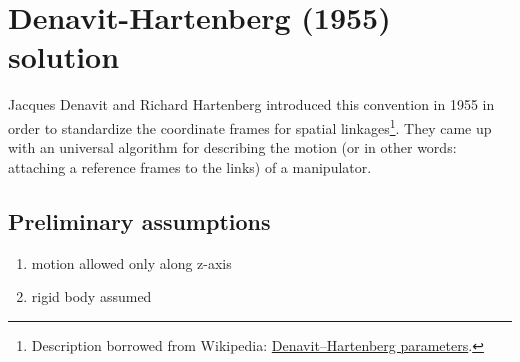 \documentclass[12pt, a4paper]{extarticle}
\begin{document}
	\def\thetaone{30}
	\def\Lone{2}
	\def\thetatwo{30}
	\def\Ltwo{2}
	\def\thetathree{30}
	\def\Lthree{1}

	\begin{center}
	\end{center}


	\section{Denavit-Hartenberg (1955) solution}

	Jacques Denavit and Richard Hartenberg introduced this convention in 1955 in order to standardize the coordinate frames for spatial linkages\footnote{Description borrowed from Wikipedia: \href{https://en.wikipedia.org/wiki/Denavit\%E2\%80\%93Hartenberg_parameters}{Denavit–Hartenberg parameters}.}. They came up with an universal algorithm for describing the motion (or in other words: attaching a reference frames to the links) of a manipulator.

	\subsection{Preliminary assumptions}
	\begin{enumerate}
		\setlength\itemsep{-0.3em}
		\item motion allowed only along z-axis
		\item rigid body assumed
	\end{enumerate}
	\noindent
\end{document}
